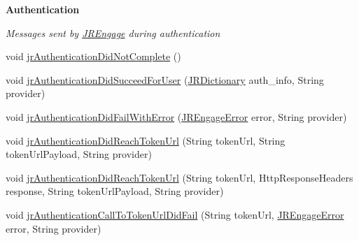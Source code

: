 \begin{Indent}{\bf Authentication}\par
{\em \label{_amgrpc75f7811d70d17dbcd88e9d03752cbed}
 Messages sent by \hyperlink{classcom_1_1janrain_1_1android_1_1engage_1_1_j_r_engage}{JREngage} during authentication }\begin{DoxyCompactItemize}
\item 
void \hyperlink{interfacecom_1_1janrain_1_1android_1_1engage_1_1_j_r_engage_delegate_a35d1b7a0d67a7f011c0c168cdae7fa4b}{jrAuthenticationDidNotComplete} ()
\item 
void \hyperlink{interfacecom_1_1janrain_1_1android_1_1engage_1_1_j_r_engage_delegate_ab629bcee7bdbdeaa868460d82361733d}{jrAuthenticationDidSucceedForUser} (\hyperlink{classcom_1_1janrain_1_1android_1_1engage_1_1types_1_1_j_r_dictionary}{JRDictionary} auth\_\-info, String provider)
\item 
void \hyperlink{interfacecom_1_1janrain_1_1android_1_1engage_1_1_j_r_engage_delegate_acadedbc321eb7e99ed43083ebb735c11}{jrAuthenticationDidFailWithError} (\hyperlink{classcom_1_1janrain_1_1android_1_1engage_1_1_j_r_engage_error}{JREngageError} error, String provider)
\item 
void \hyperlink{interfacecom_1_1janrain_1_1android_1_1engage_1_1_j_r_engage_delegate_a05fef4cfe88d741dcacb807d1d70649b}{jrAuthenticationDidReachTokenUrl} (String tokenUrl, String tokenUrlPayload, String provider)
\item 
void \hyperlink{interfacecom_1_1janrain_1_1android_1_1engage_1_1_j_r_engage_delegate_a80bb026a7d556d87527c5069f4f50350}{jrAuthenticationDidReachTokenUrl} (String tokenUrl, HttpResponseHeaders response, String tokenUrlPayload, String provider)
\item 
void \hyperlink{interfacecom_1_1janrain_1_1android_1_1engage_1_1_j_r_engage_delegate_acabfa7954d433d8af43ce7d5d78c4b5e}{jrAuthenticationCallToTokenUrlDidFail} (String tokenUrl, \hyperlink{classcom_1_1janrain_1_1android_1_1engage_1_1_j_r_engage_error}{JREngageError} error, String provider)
\end{DoxyCompactItemize}
\end{Indent}
